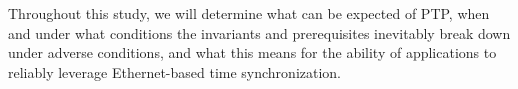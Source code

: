 Throughout this study, we will determine what can be expected of PTP, when and under what conditions the invariants and prerequisites inevitably break down under adverse conditions, and what this means for the ability of applications to reliably leverage Ethernet-based time synchronization.

